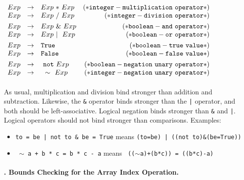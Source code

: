 \documentclass[a4paper,11pt]{article}
\begin{document}
\vbox{ 
$
\begin{array}{lclr}
Exp & \rightarrow & Exp \mbox{ }{\tt{}*}\mbox{ } Exp & {\tt (* integer-multiplication \mbox{ }operator *)}\\
Exp & \rightarrow & Exp \mbox{ }{\tt{}/}\mbox{ } Exp & {\tt (* integer-division \mbox{ }operator *)}\\ [0.9ex]

Exp & \rightarrow & Exp \mbox{ }{\tt{}\&}\mbox{ } Exp & {\tt (* boolean-and \mbox{ }operator *)}\\
Exp & \rightarrow & Exp \mbox{ }{\tt{}|}\mbox{ }\mbox{ } Exp & {\tt (* boolean-or  \mbox{ }operator *)}\\ [0.9ex]

Exp & \rightarrow & {\tt{}True} & {\tt (* boolean-true \mbox{ }value *)}\\
Exp & \rightarrow & {\tt{}False} & {\tt (* boolean-false  \mbox{ }value *)}\\ [0.9ex]

Exp & \rightarrow & \mbox{ }{\tt{}not}\mbox{ } Exp & {\tt (* boolean-negation \mbox{ }unary\mbox{ }operator *)}\\
Exp & \rightarrow & \mbox{ }{\tt{}\sim}\mbox{ }\mbox{ } Exp & {\tt (* integer-negation \mbox{ }unary\mbox{ }operator *)}\\ [0.9ex]
\end{array}
$
}

As usual, multiplication and division bind stronger than addition and subtraction.
Likewise, the \texttt{\&} operator binds stronger than the \texttt{|} operator, and both 
should be left-associative. Logical negation binds stronger than \texttt{\&} and \texttt{|}.
Logical operators should not bind stronger than comparisons. Examples:

\begin{itemize}
\setlength{\itemsep}{0ex}
\setlength{\parskip}{0ex}
\item \texttt{\small to = be | not to \& be = True} means 
\texttt{\small (to=be) | ((not to)\&(be=True))}
\item \texttt{ $\sim$ a + b * c = b * c - a} means \texttt{ (($\sim$a)+(b*c)) = ((b*c)-a)}
\end{itemize}

\paragraph{\nexttask. Bounds Checking for the Array Index Operation.} 
\end{document}
